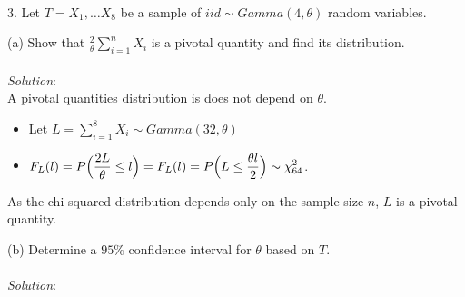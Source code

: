 \documentclass[12pt]{article}
\newcommand{\XB}{\color{black}}
\newcommand{\XBB}{\color{blue}}
\newcommand{\ds}{\displaystyle}
\begin{document}
\vspace{2.5mm}

\newpage
\XBB\hrulefill\XB \\

3. Let $ T = X_{1}, \dots X_{8} $ be a sample of $ iid \sim Gamma(4, \theta) $ random variables. \\

\XBB\hrulefill\XB 
\vspace{5mm} 

(a) Show that $ \ds \frac{2}{\theta} \sum_{i=1}^{n} X_{i} $ is a pivotal quantity and find its distribution. \\
\vspace{2.5mm} \\
\textit{Solution}:
\vspace{2.5mm} \\ 

\noindent
A pivotal quantities distribution is does not depend on $ \theta $. \\

\begin{itemize}
    \item Let $ \ds L = \sum_{i=1}^{8} X_{i} \sim Gamma(32, \theta) $
    \item $ \ds F_{L}(l) = P\Bigl( \frac{2L}{\theta} \le l \Bigr) = F_{L}(l) = P\Bigl( L \le \frac{\theta l}{2} \Bigr) \sim \chi_{64}^{2} $. \\
\end{itemize}

\noindent
As the chi squared distribution depends only on the sample size $ n $, $ L $ is a pivotal quantity. \\

\vspace{2.5mm}

(b) Determine a $ 95\% $ confidence interval for $ \theta $ based on $ T $. \\
\vspace{2.5mm} \\
\textit{Solution}:
\vspace{2.5mm} \\
\end{document}
